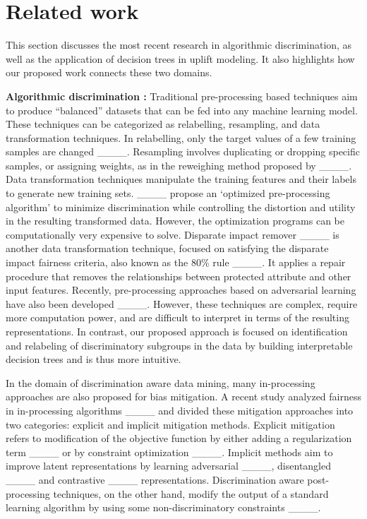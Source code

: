 \section{Related work}
This section discusses the most recent research in algorithmic discrimination, as well as the application of decision trees in uplift modeling. It also highlights how our proposed work connects these two domains. 

\textbf{Algorithmic discrimination :} 
\label{lit-review-disc}
Traditional pre-processing based techniques aim to produce “balanced” datasets that can be fed into any machine learning model. These techniques can be categorized as relabelling, resampling, and data transformation techniques. In relabelling, only the target values of a few training samples are changed ____. Resampling involves duplicating or dropping specific samples, or assigning weights, as in the reweighing method proposed by ____. Data transformation techniques manipulate the training features and their labels to generate new training sets. ____ propose an `optimized pre-processing algorithm' to minimize discrimination while controlling the distortion and utility in the resulting transformed data. However, the optimization programs can be computationally very expensive to solve. Disparate impact remover ____ is another data transformation technique, focused on satisfying the disparate impact fairness criteria, also known as the 80\% rule ____. It applies a repair procedure that removes the relationships between protected attribute and other input features. Recently, pre-processing approaches based on adversarial learning have also been developed ____. However, these techniques are complex, require more computation power, and are difficult to interpret in terms of the resulting representations. In contrast, our proposed approach is focused on identification and relabeling of discriminatory subgroups in the data by building interpretable decision trees and is thus more intuitive.

In the domain of discrimination aware data mining, many in-processing approaches are also proposed for bias mitigation. A recent study analyzed fairness in in-processing algorithms ____ and divided these mitigation approaches into two categories: explicit and implicit mitigation methods. Explicit mitigation refers to modification of the objective function by either adding a regularization term ____ or by constraint optimization ____. Implicit methods aim to improve latent representations by learning adversarial ____, disentangled ____ and contrastive ____ representations. Discrimination aware post-processing techniques, on the other hand, modify the output of a standard learning algorithm by using some non-discriminatory constraints ____.

